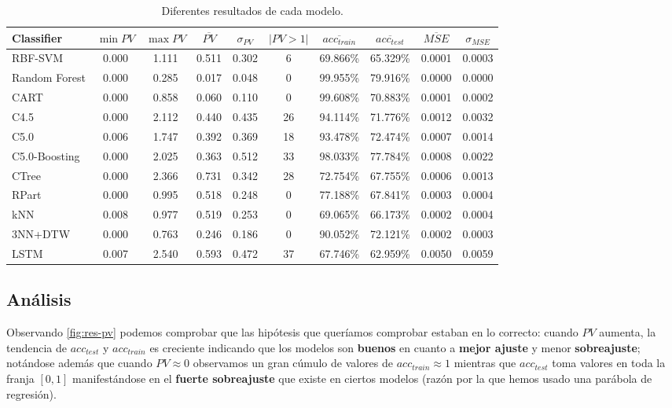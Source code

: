 \begin{table}[htbp]
\centering
\hspace*{-0.9cm}
\begin{tabular}{||l | c c c c c c c c c||}
 \hline
 Classifier & $\min PV$ & $\max PV$ & $\overline{PV}$ & $\sigma_{PV}$ & $|PV > 1|$ & $\overline{acc_{train}}$ & $\overline{acc_{test}}$ & $\overline{MSE}$ & $\sigma_{MSE}$ \\ [0.5ex]
 \hline\hline
 RBF-SVM & 0.000 & 1.111 & 0.511 & 0.302 & 6 & 69.866\% & 65.329\% & 0.0001 & 0.0003 \\
 Random Forest & 0.000 & 0.285 & 0.017 & 0.048 & 0 & 99.955\% & 79.916\% & 0.0000 & 0.0000 \\
 CART & 0.000 & 0.858 & 0.060 & 0.110 & 0 & 99.608\% & 70.883\% & 0.0001 & 0.0002 \\
 C4.5 & 0.000 & 2.112 & 0.440 & 0.435 & 26 & 94.114\% & 71.776\% & 0.0012 & 0.0032 \\
 C5.0 & 0.006 & 1.747 & 0.392 & 0.369 & 18 & 93.478\% & 72.474\% & 0.0007 & 0.0014 \\
 C5.0-Boosting & 0.000 & 2.025 & 0.363 & 0.512 & 33 & 98.033\% & 77.784\% & 0.0008 & 0.0022 \\
 CTree & 0.000 & 2.366 & 0.731 & 0.342 & 28 & 72.754\% & 67.755\% & 0.0006 & 0.0013 \\
 RPart & 0.000 & 0.995 & 0.518 & 0.248 & 0 & 77.188\% & 67.841\% & 0.0003 & 0.0004 \\
 kNN & 0.008 & 0.977 & 0.519 & 0.253 & 0 & 69.065\% & 66.173\% & 0.0002 & 0.0004 \\
 3NN+DTW & 0.000 & 0.763 & 0.246 & 0.186 & 0 & 90.052\% & 72.121\% & 0.0002 & 0.0003 \\
 LSTM & 0.007 & 2.540 & 0.593 & 0.472 & 37 & 67.746\% & 62.959\% & 0.0050 & 0.0059 \\ [1ex]
 \hline
\end{tabular}
\caption{Diferentes resultados de cada modelo.}
\label{table:datos-modelos}
\end{table}

\subsection{Análisis}

Observando \autoref{fig:res-pv} podemos comprobar que las hipótesis que queríamos comprobar estaban en lo correcto: cuando $PV$ aumenta, la tendencia de $acc_{test}$ y $acc_{train}$ es creciente indicando que los modelos son \textbf{buenos} en cuanto a \textbf{mejor ajuste} y menor \textbf{sobreajuste}; notándose además que cuando $PV \approx 0$ observamos un gran cúmulo de valores de $acc_{train} \approx 1$ mientras que $acc_{test}$ toma valores en toda la franja $[0,1]$ manifestándose en el \textbf{fuerte sobreajuste} que existe en ciertos modelos (razón por la que hemos usado una parábola de regresión).

